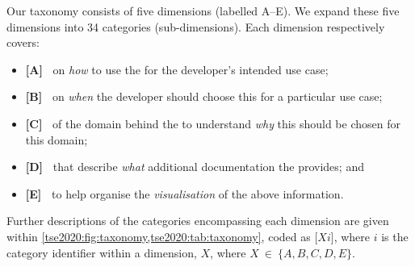 \begin{figure}[p]
\label{tse2020:fig:taxonomy}
\end{figure}

Our taxonomy consists of five dimensions (labelled A--E). We expand these five dimensions into 34 categories (sub-dimensions). Each dimension respectively covers:
\begin{itemize}
  \item \textbf{[A]~\dima{}} on \textit{how} to use the  for the developer's intended use case;
  \item \textbf{[B]~\dimb{}} on \textit{when} the developer should choose this  for a particular use case;
  \item \textbf{[C]~\dimc{}} of the domain behind the  to understand \textit{why} this  should be chosen for this domain;
  \item \textbf{[D]~\dimd{}} that describe \textit{what} additional documentation the  provides; and
  \item \textbf{[E]~\dime{}} to help organise the \textit{visualisation} of the above information.
\end{itemize}
Further descriptions of the categories encompassing each dimension are given within \cref{tse2020:fig:taxonomy,tse2020:tab:taxonomy}, coded as [$Xi$], where $i$ is the category identifier within a dimension, $X$, where $X~\in~\{ A, B, C, D, E \}$.

